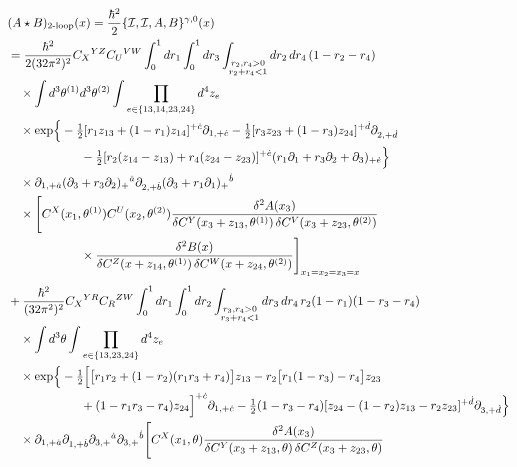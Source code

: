 \documentclass[11pt]{article}
\numberwithin{equation}{section}
\numberwithin{figure}{section}
\numberwithin{table}{section}
\begin{document}
\begin{align}
&(A\star B)_{\mathrm{2\text{-}loop}}(x)=\frac{\hbar^2}{2}\{\mathcal I,\mathcal I,A,B\}^{\gamma,0}(x)\notag\\*
&=\frac{\hbar^2}{2(32\pi^2)^2}C_X{}^{YZ}C_U{}^{VW}
\int_0^1dr_1\int_0^1dr_3
\int_{\substack{r_2,r_4>0\\r_2+r_4<1}}dr_2\,dr_4\,(1-r_2-r_4)\notag\\*
&\quad\times\int d^3\theta^{(1)}d^3\theta^{(2)}
\int\prod_{e\in\{13,14,23,24\}}d^4z_e\notag\\*
&\quad\times\exp\!\Big\{-\tfrac12[r_1z_{13}+(1-r_1)z_{14}]^{+\dot c}\partial_{1,+\dot c}
-\tfrac12[r_3z_{23}+(1-r_3)z_{24}]^{+\dot d}\partial_{2,+\dot d}\notag\\*
&\hspace{60pt}-\tfrac12[r_2(z_{14}-z_{13})+r_4(z_{24}-z_{23})]^{+\dot e}
(r_1\partial_1+r_3\partial_2+\partial_3)_{+\dot e}\Big\}\notag\\*
&\quad\times\partial_{1,+\dot a}(\partial_3+r_3\partial_2)_+{}^{\dot a}
\partial_{2,+\dot b}(\partial_3+r_1\partial_1)_+{}^{\dot b}\notag\\*
&\quad\times\Bigg[C^X(x_1,\theta^{(1)})C^U(x_2,\theta^{(2)})
\frac{\delta^2 A(x_3)}{\delta C^Y(x_3+z_{13},\theta^{(1)})\,
\delta C^V(x_3+z_{23},\theta^{(2)})}\notag\\*
&\hspace{60pt}\times
\frac{\delta^2 B(x)}{\delta C^Z(x+z_{14},\theta^{(1)})\,
\delta C^W(x+z_{24},\theta^{(2)})}\Bigg]_{x_1=x_2=x_3=x}\notag\\[4pt]
&+\frac{\hbar^2}{(32\pi^2)^2}C_X{}^{YR}C_R{}^{ZW}
\int_0^1dr_1\int_0^1dr_2
\int_{\substack{r_3,r_4>0\\r_3+r_4<1}}dr_3\,dr_4\,
 r_2(1-r_1)(1-r_3-r_4)\notag\\*
&\quad\times\int d^3\theta\int\prod_{e\in\{13,23,24\}}d^4z_e\notag\\*
&\quad\times\exp\!\Big\{-\tfrac12\Big[
\big[r_1r_2+(1-r_2)(r_1r_3+r_4)\big]z_{13}
-r_2\big[r_1(1-r_3)-r_4\big]z_{23}\notag\\*
&\hspace{60pt}+(1-r_1r_3-r_4)z_{24}\Big]^{+\dot c}\partial_{1,+\dot c}
-\tfrac12(1-r_3-r_4)
[z_{24}-(1-r_2)z_{13}-r_2z_{23}]^{+\dot d}\partial_{3,+\dot d}\Big\}\notag\\*
&\quad\times\partial_{1,+\dot a}\partial_{1,+\dot b}
\partial_{3,+}{}^{\dot a}\partial_{3,+}{}^{\dot b}
\Bigg[C^X(x_1,\theta)
\frac{\delta^2 A(x_3)}{\delta C^Y(x_3+z_{13},\theta)\,\delta C^Z(x_3+z_{23},\theta)}\notag\\*

\end{align}
\end{document}

